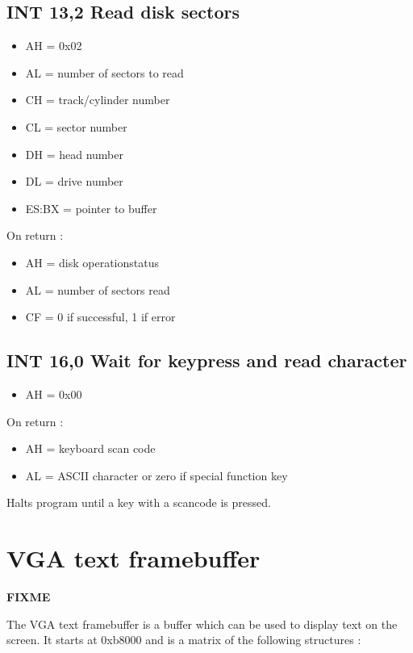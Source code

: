 \subsection{INT 13,2 Read disk sectors}
\begin{itemize}
  \item{AH = 0x02}
  \item{AL = number of sectors to read}
  \item{CH = track/cylinder number}
  \item{CL = sector number}
  \item{DH = head number}
  \item{DL = drive number}
  \item{ES:BX = pointer to buffer}
\end{itemize}

On return :

\begin{itemize}
  \item{AH = disk operationstatus}
  \item{AL = number of sectors read}
  \item{CF = 0 if successful, 1 if error}
\end{itemize}
%
%
\subsection{INT 16,0 Wait for keypress and read character}
\begin{itemize}
  \item{AH = 0x00}
\end{itemize}

On return :

\begin{itemize}
  \item{AH = keyboard scan code}
  \item{AL = ASCII character or zero if special function key}
\end{itemize}

Halts program until a key with a scancode is pressed.

%
%
\section{VGA text framebuffer}
\textbf{FIXME}

The VGA text framebuffer is a buffer which can be used to display text on the
screen. It starts at 0xb8000 and is a matrix of the following structures :

